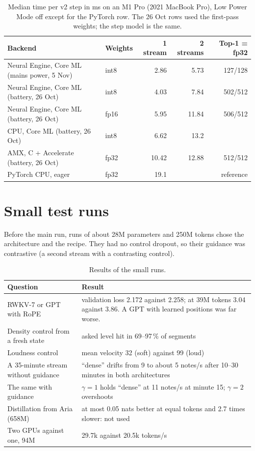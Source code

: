 \documentclass[11pt,a4paper]{article}
\begin{document}
\begin{table}[h]
\centering\small
\begin{tabular}{llrrr}
\toprule
Backend & Weights & 1 stream & 2 streams & Top-1 = fp32 \\
\midrule
Neural Engine, Core ML (mains power, 5 Nov) & int8 & 2.86 & 5.73 & 127/128 \\
Neural Engine, Core ML (battery, 26 Oct) & int8 & 4.03 & 7.84 & 502/512 \\
Neural Engine, Core ML (battery, 26 Oct) & fp16 & 5.95 & 11.84 & 506/512 \\
CPU, Core ML (battery, 26 Oct) & int8 & 6.62 & 13.2 & \\
AMX, C + Accelerate (battery, 26 Oct) & fp32 & 10.42 & 12.88 & 512/512 \\
PyTorch CPU, eager & fp32 & 19.1 & & reference \\
\bottomrule
\end{tabular}
\caption{Median time per v2 step in ms on an M1 Pro (2021 MacBook Pro), Low Power Mode off except for the PyTorch
row. The 26 Oct rows used the first-pass weights; the step model is the same.}
\end{table}

\section{Small test runs}
\label{sec:small}

Before the main run, runs of about 28M parameters and 250M tokens chose the architecture and the recipe. They had
no control dropout, so their guidance was contrastive (a second stream with a contrasting control).

\begin{table}[H]
\centering\small
\begin{tabular}{p{}p{}}
\toprule
Question & Result \\
\midrule
RWKV-7 or GPT with RoPE & validation loss 2.172 against 2.258; at 39M tokens 3.04 against 3.86. A GPT with learned positions was far worse. \\
Density control from a fresh state & asked level hit in 69--97\,\% of segments \\
Loudness control & mean velocity 32 (soft) against 99 (loud) \\
A 35-minute stream without guidance & ``dense'' drifts from 9 to about 5 notes/s after 10--30 minutes in both architectures \\
The same with guidance & $\gamma = 1$ holds ``dense'' at 11 notes/s at minute 15; $\gamma = 2$ overshoots \\
Distillation from Aria (658M) & at most 0.05 nats better at equal tokens and 2.7 times slower: not used \\
Two GPUs against one, 94M & 29.7k against 20.5k tokens/s \\
\bottomrule
\end{tabular}
\caption{Results of the small runs.}
\end{table}
\end{document}

